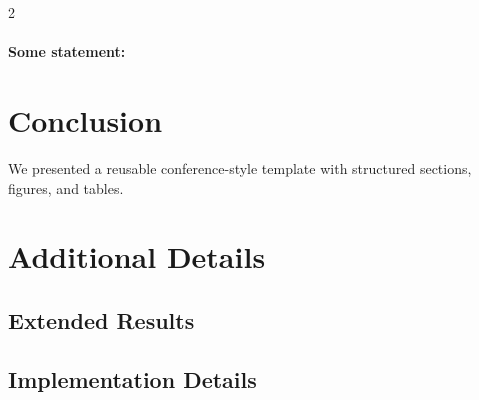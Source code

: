 \documentclass[9pt]{article}
\begin{document}
\begin{multicols}{2}
\paragraph{Some statement: } \lipsum[12]

\section{Conclusion}

We presented a reusable conference-style template with structured sections, figures, and tables.




\end{multicols}



\startappendix

\section{Additional Details}

\subsection{Extended Results}

\lipsum[12]

\subsection{Implementation Details}

\lipsum[13]
\end{document}
